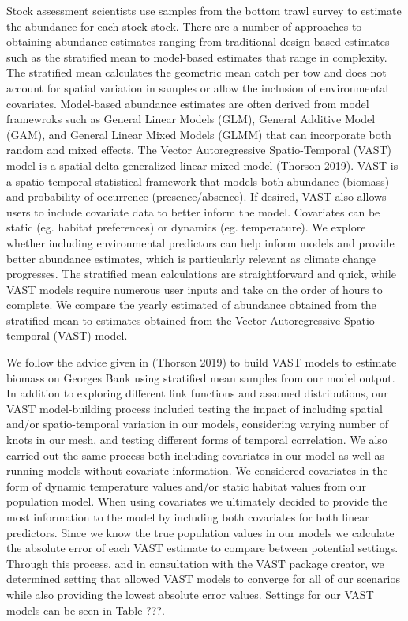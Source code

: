 \documentclass[
  12pt,
]{article}
\begin{document}
Stock assessment scientists use samples from the bottom trawl survey to estimate the abundance for each stock stock. There are a number of approaches to obtaining abundance estimates ranging from traditional design-based estimates such as the stratified mean to model-based estimates that range in complexity. The stratified mean calculates the geometric mean catch per tow and does not account for spatial variation in samples or allow the inclusion of environmental covariates. Model-based abundance estimates are often derived from model framewroks such as General Linear Models (GLM), General Additive Model (GAM), and General Linear Mixed Models (GLMM) that can incorporate both random and mixed effects. The Vector Autoregressive Spatio-Temporal (VAST) model is a spatial delta-generalized linear mixed model (Thorson 2019). VAST is a spatio-temporal statistical framework that models both abundance (biomass) and probability of occurrence (presence/absence). If desired, VAST also allows users to include covariate data to better inform the model. Covariates can be static (eg. habitat preferences) or dynamics (eg. temperature). We explore whether including environmental predictors can help inform models and provide better abundance estimates, which is particularly relevant as climate change progresses. The stratified mean calculations are straightforward and quick, while VAST models require numerous user inputs and take on the order of hours to complete. We compare the yearly estimated of abundance obtained from the stratified mean to estimates obtained from the Vector-Autoregressive Spatio-temporal (VAST) model.

We follow the advice given in (Thorson 2019) to build VAST models to estimate biomass on Georges Bank using stratified mean samples from our model output. In addition to exploring different link functions and assumed distributions, our VAST model-building process included testing the impact of including spatial and/or spatio-temporal variation in our models, considering varying number of knots in our mesh, and testing different forms of temporal correlation. We also carried out the same process both including covariates in our model as well as running models without covariate information. We considered covariates in the form of dynamic temperature values and/or static habitat values from our population model. When using covariates we ultimately decided to provide the most information to the model by including both covariates for both linear predictors. Since we know the true population values in our models we calculate the absolute error of each VAST estimate to compare between potential settings. Through this process, and in consultation with the VAST package creator, we determined setting that allowed VAST models to converge for all of our scenarios while also providing the lowest absolute error values. Settings for our VAST models can be seen in Table ???.
\end{document}
